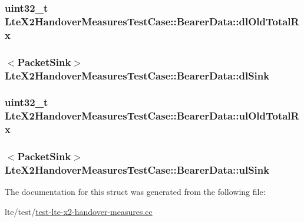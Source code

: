 \subsubsection[{\texorpdfstring{dl\+Old\+Total\+Rx}{dlOldTotalRx}}]{\setlength{\rightskip}{0pt plus 5cm}uint32\+\_\+t Lte\+X2\+Handover\+Measures\+Test\+Case\+::\+Bearer\+Data\+::dl\+Old\+Total\+Rx}\hypertarget{structLteX2HandoverMeasuresTestCase_1_1BearerData_a12502554bf769dfd773e98a9b365ffb3}{}\label{structLteX2HandoverMeasuresTestCase_1_1BearerData_a12502554bf769dfd773e98a9b365ffb3}
\subsubsection[{\texorpdfstring{dl\+Sink}{dlSink}}]{$<${\bf Packet\+Sink}$>$ Lte\+X2\+Handover\+Measures\+Test\+Case\+::\+Bearer\+Data\+::dl\+Sink}\hypertarget{structLteX2HandoverMeasuresTestCase_1_1BearerData_a1a79f900f2736306b289f94dcb0d22a4}{}\label{structLteX2HandoverMeasuresTestCase_1_1BearerData_a1a79f900f2736306b289f94dcb0d22a4}
\subsubsection[{\texorpdfstring{ul\+Old\+Total\+Rx}{ulOldTotalRx}}]{\setlength{\rightskip}{0pt plus 5cm}uint32\+\_\+t Lte\+X2\+Handover\+Measures\+Test\+Case\+::\+Bearer\+Data\+::ul\+Old\+Total\+Rx}\hypertarget{structLteX2HandoverMeasuresTestCase_1_1BearerData_a059f1e45c3b45612b0a7796ae4b40bc7}{}\label{structLteX2HandoverMeasuresTestCase_1_1BearerData_a059f1e45c3b45612b0a7796ae4b40bc7}
\subsubsection[{\texorpdfstring{ul\+Sink}{ulSink}}]{$<${\bf Packet\+Sink}$>$ Lte\+X2\+Handover\+Measures\+Test\+Case\+::\+Bearer\+Data\+::ul\+Sink}\hypertarget{structLteX2HandoverMeasuresTestCase_1_1BearerData_a65700a2cf93dc3e5ebb87bad0170cd33}{}\label{structLteX2HandoverMeasuresTestCase_1_1BearerData_a65700a2cf93dc3e5ebb87bad0170cd33}


The documentation for this struct was generated from the following file\+:\begin{DoxyCompactItemize}
\item 
lte/test/\hyperlink{test-lte-x2-handover-measures_8cc}{test-\/lte-\/x2-\/handover-\/measures.\+cc}\end{DoxyCompactItemize}
